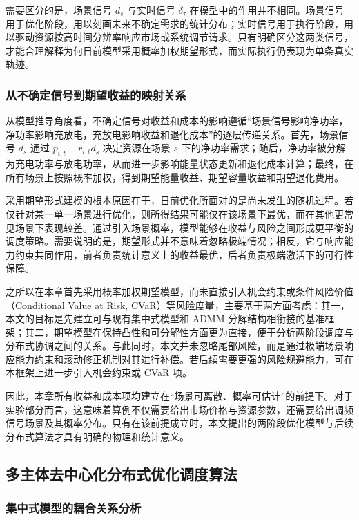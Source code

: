 需要区分的是，场景信号 $d_s$ 与实时信号 $\delta_{\tau}$ 在模型中的作用并不相同。场景信号用于优化阶段，用以刻画未来不确定需求的统计分布；实时信号用于执行阶段，用以驱动资源按高时间分辨率响应市场或系统调节请求。只有明确区分这两类信号，才能合理解释为何日前模型采用概率加权期望形式，而实际执行仍表现为单条真实轨迹。

\subsubsection{从不确定信号到期望收益的映射关系}
\label{subsubsec:vpp_admm_model_user_signal_expectation}

从模型推导角度看，不确定信号对收益和成本的影响遵循“场景信号影响净功率，净功率影响充放电，充放电影响收益和退化成本”的逐层传递关系。首先，场景信号 $d_s$ 通过 $p_{i,t} + r_{i,t} d_s$ 决定资源在场景 $s$ 下的净功率需求；随后，净功率被分解为充电功率与放电功率，从而进一步影响能量状态更新和退化成本计算；最终，在所有场景上按照概率加权，得到期望能量收益、期望容量收益和期望退化费用。

采用期望形式建模的根本原因在于，日前优化所面对的是尚未发生的随机过程。若仅针对某一单一场景进行优化，则所得结果可能仅在该场景下最优，而在其他更常见场景下表现较差。通过引入场景概率，模型能够在收益与风险之间形成更平衡的调度策略。需要说明的是，期望形式并不意味着忽略极端情况；相反，它与响应能力约束共同作用，前者负责统计意义上的收益最优，后者负责极端激活下的可行性保障。

之所以在本章首先采用概率加权期望模型，而未直接引入机会约束或条件风险价值（Conditional Value at Risk, CVaR）等风险度量，主要基于两方面考虑：其一，本文的目标是先建立可与现有集中式模型和 ADMM 分解结构相衔接的基准框架；其二，期望模型在保持凸性和可分解性方面更为直接，便于分析两阶段调度与分布式协调之间的关系。与此同时，本文并未忽略尾部风险，而是通过极端场景响应能力约束和滚动修正机制对其进行补偿。若后续需要更强的风险规避能力，可在本框架上进一步引入机会约束或 CVaR 项。

因此，本章所有收益和成本项均建立在“场景可离散、概率可估计”的前提下。对于实验部分而言，这意味着算例不仅需要给出市场价格与资源参数，还需要给出调频信号场景及其概率分布。只有在该前提成立时，本文提出的两阶段优化模型与后续分布式算法才具有明确的物理和统计意义。

\subsection{多主体去中心化分布式优化调度算法}
\label{subsec:vpp_admm_model_algorithm}

\subsubsection{集中式模型的耦合关系分析}
\label{subsubsec:vpp_admm_model_algorithm_coupling}

